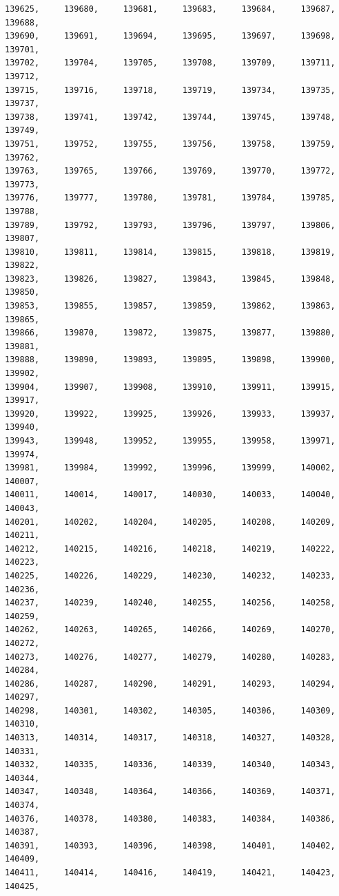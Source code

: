 \documentclass[a4paper,11pt]{report}
\begin{document}
\begin{verbatim}
139625,     139680,     139681,     139683,     139684,     139687,     139688,
139690,     139691,     139694,     139695,     139697,     139698,     139701,
139702,     139704,     139705,     139708,     139709,     139711,     139712,
139715,     139716,     139718,     139719,     139734,     139735,     139737,
139738,     139741,     139742,     139744,     139745,     139748,     139749,
139751,     139752,     139755,     139756,     139758,     139759,     139762,
139763,     139765,     139766,     139769,     139770,     139772,     139773,
139776,     139777,     139780,     139781,     139784,     139785,     139788,
139789,     139792,     139793,     139796,     139797,     139806,     139807,
139810,     139811,     139814,     139815,     139818,     139819,     139822,
139823,     139826,     139827,     139843,     139845,     139848,     139850,
139853,     139855,     139857,     139859,     139862,     139863,     139865,
139866,     139870,     139872,     139875,     139877,     139880,     139881,
139888,     139890,     139893,     139895,     139898,     139900,     139902,
139904,     139907,     139908,     139910,     139911,     139915,     139917,
139920,     139922,     139925,     139926,     139933,     139937,     139940,
139943,     139948,     139952,     139955,     139958,     139971,     139974,
139981,     139984,     139992,     139996,     139999,     140002,     140007,
140011,     140014,     140017,     140030,     140033,     140040,     140043,
140201,     140202,     140204,     140205,     140208,     140209,     140211,
140212,     140215,     140216,     140218,     140219,     140222,     140223,
140225,     140226,     140229,     140230,     140232,     140233,     140236,
140237,     140239,     140240,     140255,     140256,     140258,     140259,
140262,     140263,     140265,     140266,     140269,     140270,     140272,
140273,     140276,     140277,     140279,     140280,     140283,     140284,
140286,     140287,     140290,     140291,     140293,     140294,     140297,
140298,     140301,     140302,     140305,     140306,     140309,     140310,
140313,     140314,     140317,     140318,     140327,     140328,     140331,
140332,     140335,     140336,     140339,     140340,     140343,     140344,
140347,     140348,     140364,     140366,     140369,     140371,     140374,
140376,     140378,     140380,     140383,     140384,     140386,     140387,
140391,     140393,     140396,     140398,     140401,     140402,     140409,
140411,     140414,     140416,     140419,     140421,     140423,     140425,

\end{verbatim}
\end{document}
